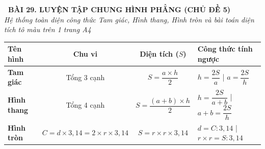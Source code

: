 \documentclass[14pt,a4paper,oneside]{extbook}
\begin{document}
\noindent
\begin{tcolorbox}[
  enhanced,
  colback=teal!8!white,
  colframe=teal!80!black,
  arc=3mm,
  boxrule=1.1pt,
  width=\linewidth,
  halign=center,
  top=2.2mm, bottom=2.2mm,
  left=3mm, right=3mm,
  drop fuzzy shadow
]
  {\large\bfseries\color{teal!95!black}\faBookmark\ BÀI 29. LUYỆN TẬP CHUNG HÌNH PHẲNG (CHỦ ĐỀ 5)}\\[2pt]
  {\scriptsize\color{black!75}\itshape Hệ thống toàn diện công thức Tam giác, Hình thang, Hình tròn và bài toán diện tích tô màu trên 1 trang A4}
\end{tcolorbox}

\vspace{3.2mm}
\noindent
\begin{tcolorbox}[
  enhanced,
  title={\footnotesize\bfseries\color{white}\faTable\ 1. Bảng vàng công thức diện tích các hình phẳng Chủ đề 5},
  colback=blue!2!white,
  colframe=blue!75!black,
  arc=2.5mm, boxrule=0.8pt, top=1.8mm, bottom=1.8mm, left=2mm, right=2mm
]
  \scriptsize
  \centering
  \begin{tabular}{|l|c|c|l|}
    \hline
    \textbf{Tên hình} & \textbf{Chu vi} & \textbf{Diện tích ($S$)} & \textbf{Công thức tính ngược} \\ \hline
    \textbf{Tam giác} & Tổng 3 cạnh & $S = \dfrac{a \times h}{2}$ & $h = \dfrac{2S}{a}$ \quad | \quad $a = \dfrac{2S}{h}$ \\ \hline
    \textbf{Hình thang} & Tổng 4 cạnh & $S = \dfrac{(a + b) \times h}{2}$ & $h = \dfrac{2S}{a + b}$ \quad | \quad $a + b = \dfrac{2S}{h}$ \\ \hline
    \textbf{Hình tròn} & $C = d \times 3,14 = 2 \times r \times 3,14$ & $S = r \times r \times 3,14$ & $d = C : 3,14$ \quad | \quad $r \times r = S : 3,14$ \\ \hline
  \end{tabular}
\end{tcolorbox}

\vspace{3mm}
\end{document}
